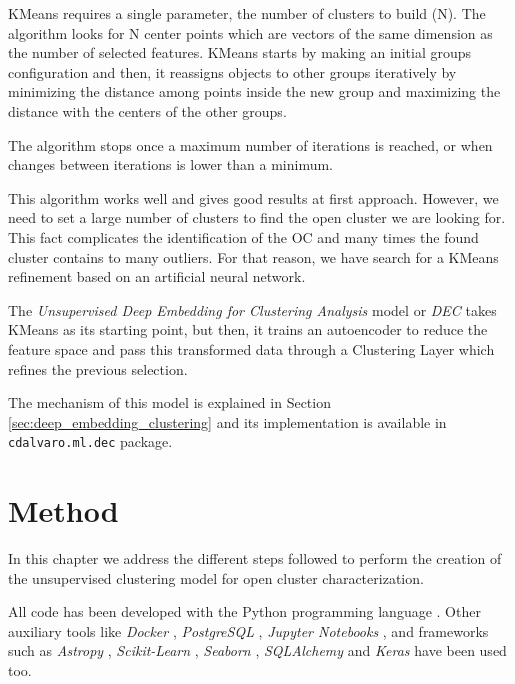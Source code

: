 \documentclass[11pt, a4paper, english]{book}
\begin{document}
KMeans requires a single parameter, the number of clusters to build (N).
The algorithm looks for N center points which are vectors of the same dimension as the number of selected features.
KMeans starts by making an initial groups configuration and then,
it reassigns objects to other groups iteratively by minimizing the distance among points
inside the new group and maximizing the distance with the centers of the other groups.

The algorithm stops once a maximum number of iterations is reached,
or when changes between iterations is lower than a minimum.

This algorithm works well and gives good results at first approach.
However, we need to set a large number of clusters to find the open cluster we are looking for.
This fact complicates the identification of the OC and many times the found cluster contains to many outliers.
For that reason, we have search for a KMeans refinement based on an artificial neural network.

The \emph{Unsupervised Deep Embedding for Clustering Analysis} model
or \emph{DEC} \cite{xie2016unsupervised} takes KMeans as its starting point,
but then, it trains an autoencoder to reduce the feature space
and pass this transformed data through a Clustering Layer which refines the previous selection.

The mechanism of this model is explained in Section \ref{sec:deep_embedding_clustering}
and its implementation is available in \verb|cdalvaro.ml.dec| package.

\chapter{Method}
\label{chap:method}

In this chapter we address the different steps followed to perform the creation of
the unsupervised clustering model for open cluster characterization.

All code has been developed with the Python programming language \cite{Python3}.
Other auxiliary tools like \emph{Docker} \cite{merkel2014docker},
\emph{PostgreSQL} \cite{postgresql}, \emph{Jupyter Notebooks} \cite{Kluyver2016jupyter},
and frameworks such as \emph{Astropy} \cite{astropy:2013} \cite{astropy:2018},
\emph{Scikit-Learn} \cite{scikit-learn}, \emph{Seaborn} \cite{michael_waskom_2017_883859},
\emph{SQLAlchemy} \cite{sqlalchemy} and \emph{Keras} \cite{chollet2015keras} have been used too.
\end{document}
